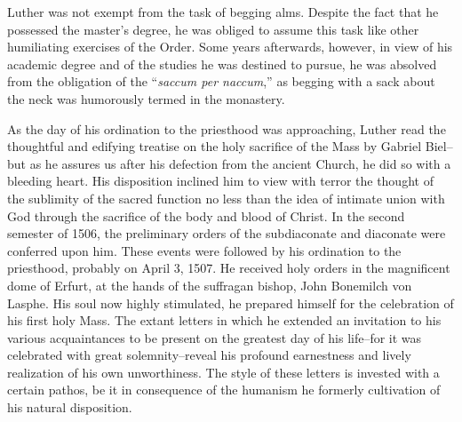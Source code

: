 Luther was not exempt from the task of begging alms. Despite
the fact that he possessed the master’s degree, he was obliged to assume
this task like other humiliating exercises of the Order. Some
years afterwards, however, in view of his academic degree and of
the studies he was destined to pursue, he was absolved from the obligation of the
“\textit{saccum per naccum},” as begging with a sack about the
neck was humorously termed in the monastery.

As the day of his ordination to the priesthood was approaching,
Luther read the thoughtful and edifying treatise on the holy sacrifice
of the Mass by Gabriel Biel--but as he assures us after his defection from the ancient Church, he did so with a bleeding heart.
His disposition inclined him to view with terror the thought of the
sublimity of the sacred function no less than the idea of intimate
union with God through the sacrifice of the body and blood of
Christ. In the second semester of 1506, the preliminary orders of the
subdiaconate and diaconate were conferred upon him. These events
were followed by his ordination to the priesthood, probably on April 3, 1507.
He received holy orders in the magnificent dome of Erfurt,
at the hands of the suffragan bishop, John Bonemilch von Lasphe.
His soul now highly stimulated, he prepared himself for the celebration
of his first holy Mass. The extant letters in which he extended an
invitation to his various acquaintances to be present on the greatest
day of his life--for it was celebrated with great solemnity--reveal
his profound earnestness and lively realization of his own unworthiness.
The style of these letters is invested with a certain pathos, be it
in consequence of the humanism he formerly cultivation of his natural disposition.

